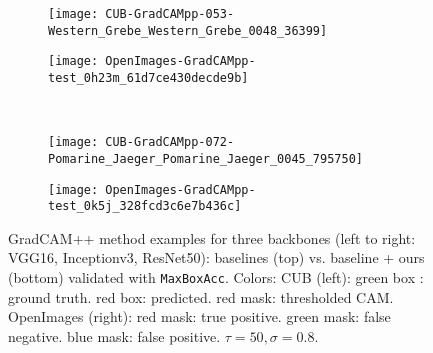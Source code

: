 \documentclass[twocolumn]{article}
\newcommand\maxboxacc{\texttt{MaxBoxAcc}\xspace}
\theoremstyle{definition}
\begin{document}
\begin{figure*}
\begin{subfigure}[b]{0.49\textwidth}
         \centering
         \texttt{[image: CUB-GradCAMpp-053-Western\_Grebe\_Western\_Grebe\_0048\_36399]}
     \end{subfigure}
     \hfill
     \begin{subfigure}[b]{0.49\textwidth}
         \centering
         \texttt{[image: OpenImages-GradCAMpp-test\_0h23m\_61d7ce430decde9b]}
     \end{subfigure}
     \\
     \vspace{0.1cm}
     \begin{subfigure}[b]{0.49\textwidth}
         \centering
         \texttt{[image: CUB-GradCAMpp-072-Pomarine\_Jaeger\_Pomarine\_Jaeger\_0045\_795750]}
     \end{subfigure}
     \hfill
     \begin{subfigure}[b]{0.49\textwidth}
         \centering
         \texttt{[image: OpenImages-GradCAMpp-test\_0k5j\_328fcd3c6e7b436c]}
     \end{subfigure}
        \caption{GradCAM++ method examples for three backbones (left to right: VGG16, Inceptionv3, ResNet50): baselines (top) vs. baseline + ours (bottom)  validated with \maxboxacc. Colors: CUB (left): green box : ground truth. red box: predicted. red mask: thresholded CAM. OpenImages (right): red mask: true positive. green mask: false negative. blue mask: false positive. ${\tau=50, \sigma=0.8}$.}
        \label{fig:gradcampp-cub-openim-example-pred}
\end{figure*}
\end{document}
